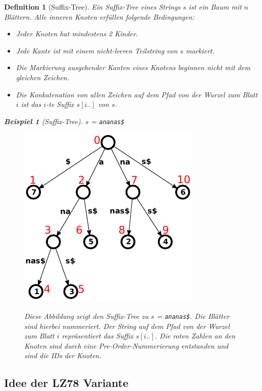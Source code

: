 \documentclass[a4paper,11pt]{scrartcl}%
\theoremstyle{change}
\theoremstyle{nonumberplain}
\theoremstyle{change}
\newtheorem{definition}[theorem]{Definition}
\theoremstyle{nonumberplain}
\theoremstyle{change}
\newtheorem{beispiel}[theorem]{Beispiel}
\theoremstyle{nonumberplain}
\begin{document}
	\begin{definition}[Suffix-Tree]
		Ein Suffix-Tree eines Strings $s$ ist ein Baum mit $n$ Blättern. Alle inneren Knoten erfüllen folgende Bedingungen:
		\begin{itemize}
			\item Jeder Knoten hat mindestens 2 Kinder.
			\item Jede Kante ist mit einem nicht-leeren Teilstring von $s$ markiert.
			\item Die Markierung ausgehender Kanten eines Knotens beginnen nicht mit dem gleichen Zeichen.
			\item Die Konkatenation von allen Zeichen auf dem Pfad von der Wurzel zum Blatt $i$ ist das $i$-te Suffix $s[i..]$ von $s$.
		\end{itemize}
		\begin{beispiel}[Suffix-Tree]
			$s$ = \texttt{ananas\$}
			\begin{figure}
				\centering
				  \includegraphics[scale=0.8]{./pics/ananas_suffixTree_inorder}
				  \cite{suffixtreeurl}
				  \caption{Diese Abbildung zeigt den Suffix-Tree zu $s$ = \texttt{ananas\$}. Die Blätter sind hierbei nummeriert. Der String auf dem Pfad von der Wurzel zum Blatt $i$ repräsentiert das Suffix $s[i..]$. Die roten Zahlen an den Knoten sind durch eine Pre-Order-Nummerierung entstanden und sind die IDs der Knoten. }
				  \label{fig:suffixTree}
			\end{figure}
		\end{beispiel}
		
	\end{definition}
	\newpage
	\subsection{Idee der LZ78 Variante}
\end{document}
